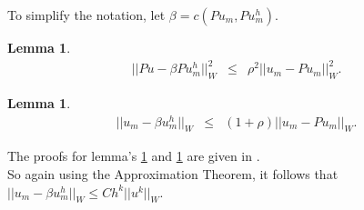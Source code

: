 \documentclass[../../main.tex]{subfiles}
\begin{document}
To simplify the notation, let $\beta = c(Pu_m,Pu_m^h)$.

\newtheorem{Lem_7}[Lem_1]{Lemma} 
\begin{Lem_7}
	\label{Lem_7}
	\begin{eqnarray*}
		||Pu - \beta Pu^h_m||_{W}^{2} &\leq & {\rho}^{2} ||u_{m} - Pu_{m}||_{W}^{2}.
	\end{eqnarray*}
\end{Lem_7}
\begin{comment}
\begin{proof}

Using Lemma \ref{Lem_6}:
\begin{eqnarray*}
||Pu - \beta u_{m}^{h}||_{W}^{2} &=& \sum_{j\neq m} \left(\frac{\lambda_{m}}{|\lambda_{m} - \lambda_{j}^{h}|}\right)^{2} c( u_{m} - Pu_{m} ,u_{j}^{h})^{2},\\
				&\leq & \rho^{2} \sum_{j\neq m} c( u_{m} - Pu_{m} ,u_{j}^{h})^{2}, \\
				&\leq & \rho^{2} \sum_{j=1}^{N} c( u_{m} - Pu_{m} ,u_{j}^{h})^{2}, \\
				& = & \rho^{2} ||u_m - Pu_m||_{W}^{2}.\\
\end{eqnarray*}
\end{proof}
\end{comment}

\newtheorem{Lem_8}[Lem_1]{Lemma} 
\begin{Lem_8}
	\label{Lem_8}
	\begin{eqnarray*}
		||u_{m} - \beta u_{m}^{h}||_{W} &\leq & \left(1+\rho\right)||u_{m}-Pu_{m}||_{W}.
	\end{eqnarray*}
\end{Lem_8}
\begin{comment}
\begin{proof}
	\begin{eqnarray*}
	||u_{m} - \beta u_{m}^{h}||_{W} & \leq & ||u_{m}-Pu_{m}||_{W} + ||Pu_{m} - \beta u_{m}^{h}||_{W} \\
				& \leq & \left(1+\rho\right)||u_{m}-Pu_{m}||_{W} \ \ \textrm{ (by Lemma \ref{Lem_7})}
	\end{eqnarray*}
\end{proof}
\end{comment}

The proofs for lemma's \ref{Lem_7} and \ref{Lem_8} are given in \cite{SF73}.\\

So again using the Approximation Theorem, it follows that $||u_{m} - \beta u_{m}^{h}||_{W}\leq Ch^{k}||u^{k}||_{W}$.
\end{document}
